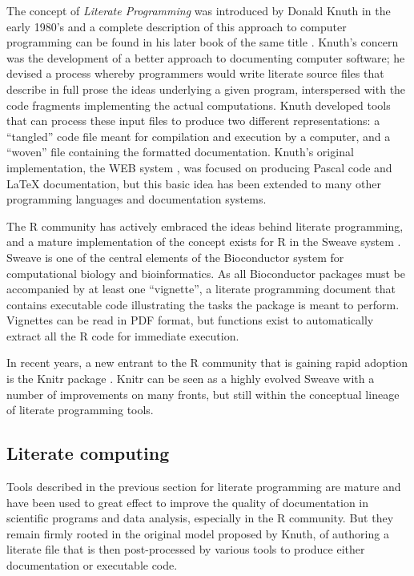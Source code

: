 \documentclass[ChapterTOCs,krantz2]{krantz} %
\begin{document}
The concept of \emph{Literate Programming} was introduced by Donald Knuth in
the early 1980's \cite{Knuth:1983:LP} and a complete description of this
approach to computer programming can be found in his later book of the same
title \cite{Knuth92}.  Knuth's concern was the development of a better approach
to documenting computer software; he devised a process whereby programmers
would write literate source files that describe in full prose the ideas
underlying a given program, interspersed with the code fragments implementing
the actual computations.  Knuth developed tools that can process these input
files to produce two different representations: a ``tangled'' code file meant
for compilation and execution by a computer, and a ``woven'' file containing
the formatted documentation.  Knuth's original implementation, the WEB system
\cite{Knuth:1983:WSS}, was focused on producing Pascal code and \LaTeX
documentation, but this basic idea has been extended to many other programming
languages and documentation systems.  

The R community has actively embraced the ideas behind literate programming,
and a mature implementation of the concept exists for R in the Sweave system
\cite{lmucs-papers:Leisch:2002}.  Sweave is one of the central elements of the
Bioconductor system \cite{Gentleman2004, Dudoit2003} for computational biology
and bioinformatics.  As all Bioconductor packages must be accompanied by at
least one ``vignette'', a literate programming document that contains
executable code illustrating the tasks the package is meant to perform.
Vignettes can be read in PDF format, but functions exist to automatically
extract all the R code for immediate execution.

In recent years, a new entrant to the R community that is gaining rapid
adoption is the Knitr package \cite{xie2012knitr}.  Knitr can be seen as a
highly evolved Sweave with a number of improvements on many fronts, but still
within the conceptual lineage of literate programming tools.

\subsection{Literate computing}

Tools described in the previous section for literate programming are mature and
have been used to great effect to improve the quality of documentation in
scientific programs and data analysis, especially in the R community.  But they
remain firmly rooted in the original model proposed by Knuth, of authoring a
literate file that is then post-processed by various tools to produce either
documentation or executable code.  
\end{document}
